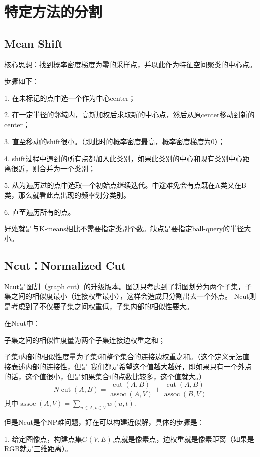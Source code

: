 \documentclass[12pt]{article}
\begin{document}
\section{特定方法的分割}
\subsection{Mean Shift}
核心思想：找到概率密度梯度为零的采样点，并以此作为特征空间聚类的中心点。

步骤如下：

1. 在未标记的点中选一个作为中心center；

2. 在一定半径的邻域内，高斯加权后求取新的中心点，然后从原center移动到新的center；

3. 直至移动的shift很小。（即此时的概率密度最高，概率密度梯度为0）；

4. shift过程中遇到的所有点都加入此类别，如果此类别的中心和现有类别中心距离很近，则合并为一个类别；

5. 从为遍历过的点中选取一个初始点继续迭代。中途难免会有点既在A类又在B类，那么就看此点出现的频率划分类别。

6. 直至遍历所有的点。

好处就是与K-means相比不需要指定类别个数。缺点是要指定ball-query的半径大小。

\subsection{Ncut：Normalized Cut}
Ncut是图割（graph cut）的升级版本。图割只考虑到了将图划分为两个子集，子集之间的相似度最小（连接权重最小），这样会造成只分割出去一个外点。
Ncut则是考虑到了不仅要子集之间权重低，子集内部的相似性要大。

在Ncut中：

子集之间的相似性度量为两个子集连接边权重之和；

子集i内部的相似性度量为子集i和整个集合的连接边权重之和。（这个定义无法直接表述内部的连接性，但是
我们都是希望这个值越大越好，即如果只有一个外点的话，这个值很小，但是如果集合i的点数比较多，这个值就大。）
\begin{equation}
    \nonumber
    N \operatorname{cut}(A, B)=\frac{\operatorname{cut}(A, B)}{\operatorname{assoc}(A, V)}+\frac{\operatorname{cut}(A, B)}{\operatorname{assoc}(B, V)}
\end{equation}
其中$\operatorname{assoc}(A, V)=\sum_{u \in A, t \in V} w(u, t)$.

但是Ncut是个NP难问题，好在可以构建近似解，具体的步骤是：

1. 给定图像点，构建点集$G(V,E)$,点就是像素点，边权重就是像素距离（如果是RGB就是三维距离）。
\end{document}
